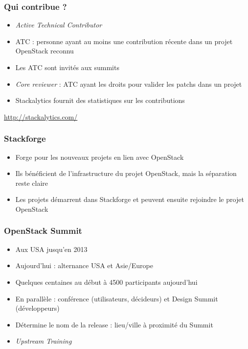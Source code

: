   \begin{frame}
    \frametitle{Qui contribue ?}
    \begin{itemize}
      \item \textit{Active Technical Contributor}
      \item ATC : personne ayant au moins une contribution récente dans un projet OpenStack reconnu
      \item Les ATC sont invités aux summits
      \item \textit{Core reviewer} : ATC ayant les droits pour valider les patchs dans un projet
      \item Stackalytics fournit des statistiques sur les contributions
    \end{itemize}
    \url{http://stackalytics.com/}
  \end{frame}

  \begin{frame}
    \frametitle{Stackforge}
    \begin{itemize}
      \item Forge pour les nouveaux projets en lien avec OpenStack
      \item Ils bénéficient de l'infrastructure du projet OpenStack, mais la séparation reste claire
      \item Les projets démarrent dans Stackforge et peuvent ensuite rejoindre le projet OpenStack
    \end{itemize}
  \end{frame}

  \begin{frame}
    \frametitle{OpenStack Summit}
    \begin{itemize}
      \item Aux USA jusqu'en 2013
      \item Aujourd'hui : alternance USA et Asie/Europe
      \item Quelques centaines au début à 4500 participants aujourd'hui
      \item En parallèle : conférence (utilisateurs, décideurs) et Design Summit (développeurs)
      \item Détermine le nom de la release : lieu/ville à proximité du Summit
      \item \textit{Upstream Training}
    \end{itemize}
  \end{frame}

